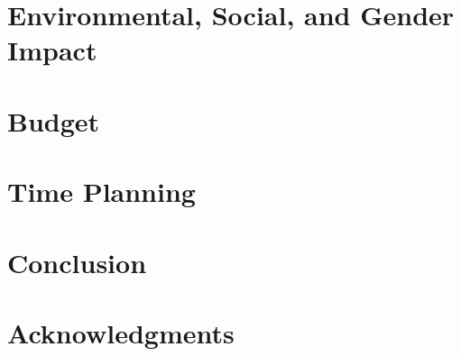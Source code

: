 \documentclass[a4paper, 11pt, titlepage, twoside]{article}
\begin{document}
\section{Environmental, Social, and Gender Impact}

\newpage

\cleardoublepage
\section{Budget}


\cleardoublepage
\section{Time Planning}


\section{Conclusion}\label{Conclusion}

\newpage

\section*{Acknowledgments}\label{acknow} 


\appendix
\cleardoublepage

\cleardoublepage
\printbibliography
\end{document}
